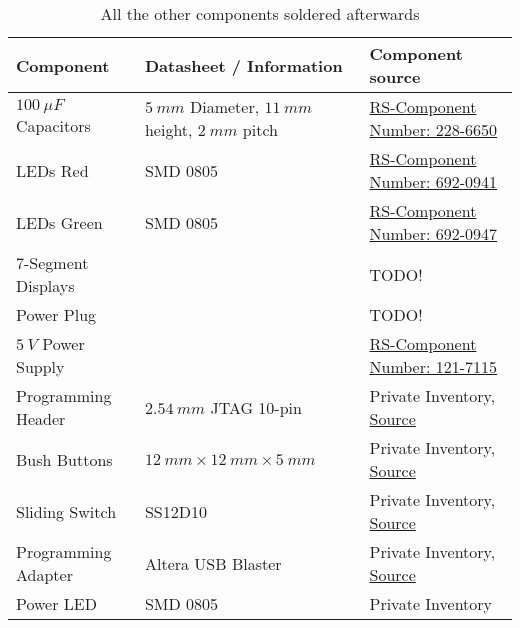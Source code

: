 \begin{table}[h!]
	\centering
	\begin{tabular}{|p{}|p{}|p{}|}
		\hline
		Component & Datasheet / Information & Component source\\
		\hline
		$\SI{100}{\mu{}F}$ Capacitors & $\SI{5}{mm}$ Diameter, $\SI{11}{mm}$ height, $\SI{2}{mm}$ pitch & \href{https://de.rs-online.com/web/p/aluminium-elektrolytkondensatoren/2286650}{RS-Component Number: 228-6650} \\
		\hline
		LEDs Red & SMD 0805 & \href{https://de.rs-online.com/web/p/leds/6920941}{RS-Component Number: 692-0941} \\
		\hline
		LEDs Green & SMD 0805 & \href{https://de.rs-online.com/web/p/leds/6920947}{RS-Component Number: 692-0947} \\
		\hline
		7-Segment Displays & & TODO! \\
		\hline
		Power Plug & & TODO! \\
		\hline
		$\SI{5}{V}$ Power Supply & & \href{https://de.rs-online.com/web/p/steckernetzteile/1217115}{RS-Component Number: 121-7115} \\
		\hline
		Programming Header & $\SI{2,54}{mm}$ JTAG 10-pin & Private Inventory, \href{https://www.amazon.de/dp/B00R1LS3QY}{Source} \\
		\hline
		Bush Buttons & $\SI{12}{mm} \times \SI{12}{mm} \times \SI{5}{mm}$ & Private Inventory, \href{https://de.aliexpress.com/item/32726177349.html}{Source} \\
		\hline
		Sliding Switch & SS12D10 & Private Inventory, \href{https://de.aliexpress.com/item/4001325159135.html}{Source} \\
		\hline
		Programming Adapter & Altera USB Blaster & Private Inventory, \href{https://de.aliexpress.com/item/1005006124817358.html}{Source} \\
		\hline
		Power LED & SMD 0805 & Private Inventory \\
		\hline
	\end{tabular}
	\caption{All the other components soldered afterwards}
	\label{tab:components_other}
\end{table}
